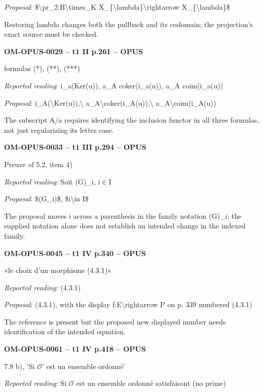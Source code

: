 \emph{Proposal}: \$\textbackslash{}pr\_2:H\textbackslash{}times\_K X\_\{\textbackslash{}lambda\}\textbackslash{}rightarrow X\_\{\textbackslash{}lambda\}\$\par
Restoring lambda changes both the pullback and its codomain; the projection's exact source must be checked.\par
\par\noindent\textbf{OM-OPUS-0029 -- t1 II p.261 -- OPUS}\par
formulas (*), (**), (***)\par
\emph{Reported reading}: i\_a(Ker(u)), a\_A coker(i\_a(u)), a\_A coim(i\_a(u))\par
\emph{Proposal}: i\_A(\textbackslash{}Ker(u)),\textbackslash{} a\_A\textbackslash{}coker(i\_A(u)),\textbackslash{} a\_A\textbackslash{}coim(i\_A(u))\par
The subscript A/a requires identifying the inclusion functor in all three formulas, not just regularizing its letter case.\par
\par\noindent\textbf{OM-OPUS-0033 -- t1 III p.294 -- OPUS}\par
Preuve of 5.2, item 4)\par
\emph{Reported reading}: Soit (G)\_i, i\ensuremath{\in}I\par
\emph{Proposal}: \$(G\_i)\$, \$i\textbackslash{}in I\$\par
The proposal moves i across a parenthesis in the family notation (G)\_i; the supplied notation alone does not establish an intended change in the indexed family.\par
\par\noindent\textbf{OM-OPUS-0045 -- t1 IV p.340 -- OPUS}\par
«le choix d'un morphisme (4.3.1)»\par
\emph{Reported reading}: (4.3.1)\par
\emph{Proposal}: (4.3.1), with the display f:E\textbackslash{}rightarrow P on p. 339 numbered (4.3.1)\par
The reference is present but the proposed new displayed number needs identification of the intended equation.\par
\par\noindent\textbf{OM-OPUS-0061 -- t1 IV p.418 -- OPUS}\par
7.8 b), 'Si \ensuremath{𝒪}' est un ensemble ordonné'\par
\emph{Reported reading}: Si \ensuremath{𝒪} est un ensemble ordonné satisfaisant (no prime)\par
